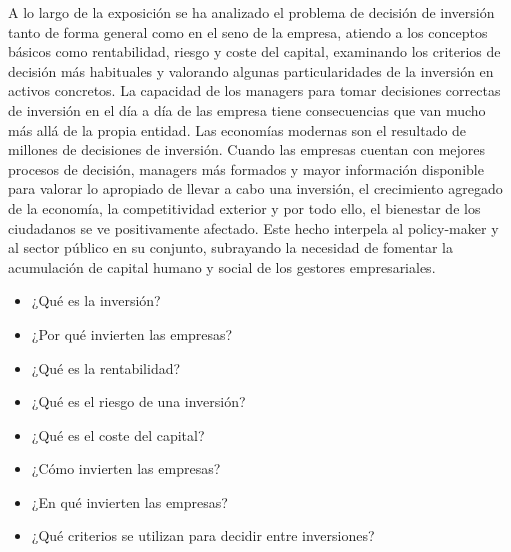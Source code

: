 \documentclass{nuevotema}
\begin{document}
A lo largo de la exposición se ha analizado el problema de decisión de inversión tanto de forma general como en el seno de la empresa, atiendo a los conceptos básicos como rentabilidad, riesgo y coste del capital, examinando los criterios de decisión más habituales y valorando algunas particularidades de la inversión en activos concretos. La capacidad de los managers para tomar decisiones correctas de inversión en el día a día de las empresa tiene consecuencias que van mucho más allá de la propia entidad. Las economías modernas son el resultado de millones de decisiones de inversión. Cuando las empresas cuentan con mejores procesos de decisión, managers más formados y mayor información disponible para valorar lo apropiado de llevar a cabo una inversión, el crecimiento agregado de la economía, la competitividad exterior y por todo ello, el bienestar de los ciudadanos se ve positivamente afectado. Este hecho interpela al policy-maker y al sector público en su conjunto, subrayando la necesidad de fomentar la acumulación de capital humano y social de los gestores empresariales.



\begin{itemize} 
    \item ¿Qué es la inversión?
    \item ¿Por qué invierten las empresas?
    \item ¿Qué es la rentabilidad?
    \item ¿Qué es el riesgo de una inversión?
    \item ¿Qué es el coste del capital?
    \item ¿Cómo invierten las empresas?
    \item ¿En qué invierten las empresas?
    \item ¿Qué criterios se utilizan para decidir entre inversiones?
\end{itemize}


\esquemacorto
\end{document}
